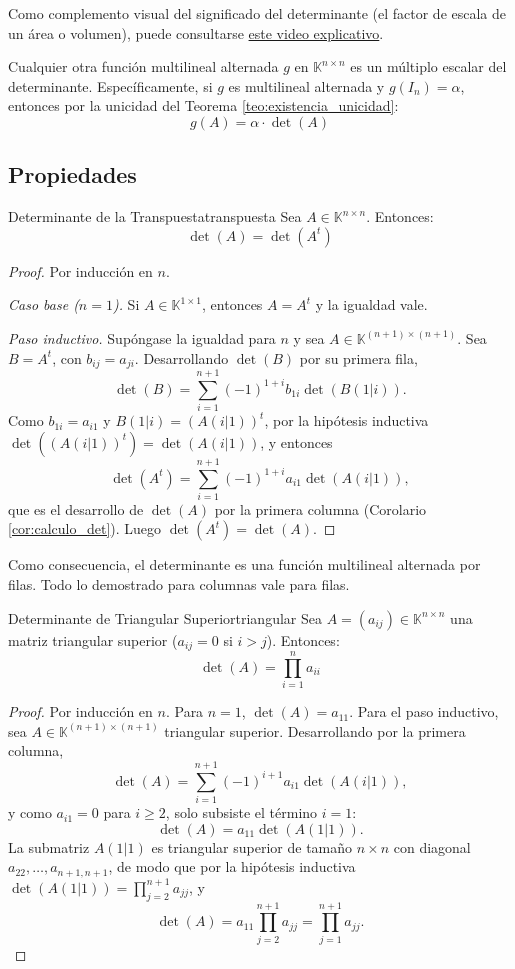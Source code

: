 \documentclass[11pt, a4paper]{article}
\begin{document}
\obs Como complemento visual del significado del determinante (el factor de escala de un área o volumen), puede consultarse \href{https://www.youtube.com/watch?v=Ip3X9LOh2dk}{este video explicativo}.

\obs Cualquier otra función multilineal alternada $g$ en $\mathbb{K}^{n \times n}$ es un múltiplo escalar del determinante.
Específicamente, si $g$ es multilineal alternada y $g(I_n) = \alpha$, entonces por la unicidad del Teorema \ref{teo:existencia_unicidad}:
\[ g(A) = \alpha \cdot \det(A) \]

\subsection{Propiedades}

\begin{proposicion}{Determinante de la Transpuesta}{transpuesta}
Sea $A \in \mathbb{K}^{n \times n}$. Entonces:
\[ \det(A) = \det(A^t) \]
\end{proposicion}

\begin{proof}
Por inducción en $n$.

\textit{Caso base ($n=1$).} Si $A \in \mathbb{K}^{1 \times 1}$, entonces $A = A^t$ y la igualdad vale.

\textit{Paso inductivo.} Supóngase la igualdad para $n$ y sea $A \in \mathbb{K}^{(n+1) \times (n+1)}$. Sea $B = A^t$, con $b_{ij} = a_{ji}$. Desarrollando $\det(B)$ por su primera fila,
\[
\det(B) = \sum_{i=1}^{n+1} (-1)^{1+i} b_{1i} \det(B(1|i)).
\]
Como $b_{1i} = a_{i1}$ y $B(1|i) = (A(i|1))^t$, por la hipótesis inductiva $\det((A(i|1))^t) = \det(A(i|1))$, y entonces
\[
\det(A^t) = \sum_{i=1}^{n+1} (-1)^{1+i} a_{i1} \det(A(i|1)),
\]
que es el desarrollo de $\det(A)$ por la primera columna (Corolario \ref{cor:calculo_det}). Luego $\det(A^t) = \det(A)$.
\end{proof}

\obs Como consecuencia, el determinante es una función multilineal alternada por filas. Todo lo demostrado para columnas vale para filas.

\begin{proposicion}{Determinante de Triangular Superior}{triangular}
Sea $A = (a_{ij}) \in \mathbb{K}^{n \times n}$ una matriz triangular superior ($a_{ij} = 0$ si $i > j$). Entonces:
\[ \det(A) = \prod_{i=1}^n a_{ii} \]
\end{proposicion}

\begin{proof}
Por inducción en $n$. Para $n=1$, $\det(A) = a_{11}$. Para el paso inductivo, sea $A \in \mathbb{K}^{(n+1) \times (n+1)}$ triangular superior. Desarrollando por la primera columna,
\[
\det(A) = \sum_{i=1}^{n+1} (-1)^{i+1} a_{i1} \det(A(i|1)),
\]
y como $a_{i1} = 0$ para $i \ge 2$, solo subsiste el término $i=1$:
\[
\det(A) = a_{11} \det(A(1|1)).
\]
La submatriz $A(1|1)$ es triangular superior de tamaño $n \times n$ con diagonal $a_{22}, \dots, a_{n+1,n+1}$, de modo que por la hipótesis inductiva $\det(A(1|1)) = \prod_{j=2}^{n+1} a_{jj}$, y
\[
\det(A) = a_{11} \prod_{j=2}^{n+1} a_{jj} = \prod_{j=1}^{n+1} a_{jj}.
\]
\end{proof}
\end{document}
